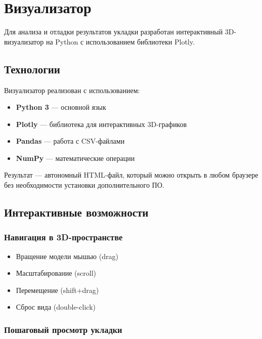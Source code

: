 \section{Визуализатор}

Для анализа и отладки результатов укладки разработан интерактивный 3D-визуализатор на Python с использованием библиотеки Plotly.


\subsection{Технологии}

Визуализатор реализован с использованием:
\begin{itemize}
    \item \textbf{Python 3} --- основной язык
    \item \textbf{Plotly} --- библиотека для интерактивных 3D-графиков
    \item \textbf{Pandas} --- работа с CSV-файлами
    \item \textbf{NumPy} --- математические операции
\end{itemize}

Результат --- автономный HTML-файл, который можно открыть в любом браузере без необходимости установки дополнительного ПО.

\subsection{Интерактивные возможности}

\subsubsection{Навигация в 3D-пространстве}
\begin{itemize}
    \item Вращение модели мышью (drag)
    \item Масштабирование (scroll)
    \item Перемещение (shift+drag)
    \item Сброс вида (double-click)
\end{itemize}

\subsubsection{Пошаговый просмотр укладки}

